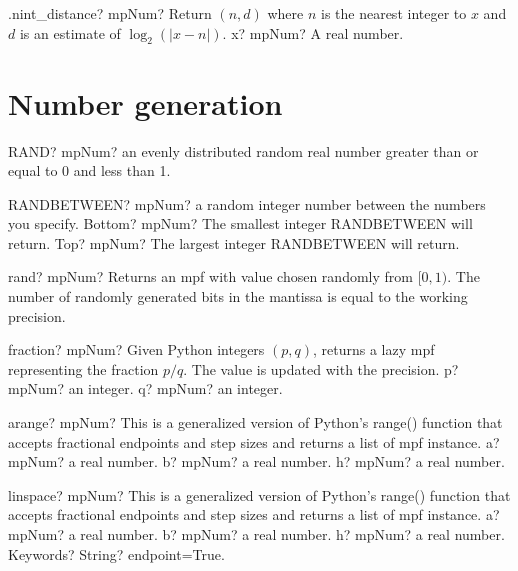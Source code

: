 \documentclass[12pt,a4paper,openany]{book}
\begin{document}
\begin{mpFunctionsExtract}
\mpFunctionOne
{.nint\_distance? mpNum? Return $(n,d)$ where $n$ is the nearest integer to $x$ and $d$ is an estimate of $\log_2(|x-n|)$.}
{x? mpNum? A real number.}
\end{mpFunctionsExtract}

\section{Number generation}

\begin{mpFunctionsExtract}
\mpWorksheetFunctionZero
{RAND? mpNum? an evenly distributed random real number greater than or equal to 0 and less than 1.}
\end{mpFunctionsExtract}

\begin{mpFunctionsExtract}
\mpWorksheetFunctionTwoNotImplemented
{RANDBETWEEN? mpNum?  a random integer number between the numbers you specify.}
{Bottom? mpNum? The smallest integer RANDBETWEEN will return.}
{Top? mpNum? The largest integer RANDBETWEEN will return.}
\end{mpFunctionsExtract}

\begin{mpFunctionsExtract}
\mpFunctionZero
{rand? mpNum? Returns an mpf with value chosen randomly from $[0,1)$. The number of randomly generated bits in the mantissa is equal to the working precision.}
\end{mpFunctionsExtract}

\begin{mpFunctionsExtract}
\mpFunctionTwo
{fraction? mpNum?  Given Python integers $(p,q)$, returns a lazy mpf representing the fraction $p/q$. The value is updated with the precision.}
{p? mpNum? an integer.}
{q? mpNum? an integer.}
\end{mpFunctionsExtract}

\begin{mpFunctionsExtract}
\mpFunctionThree
{arange? mpNum?  This is a generalized version of Python's range() function that accepts fractional endpoints and step sizes and returns a list of mpf instance.}
{a? mpNum? a real number.}
{b? mpNum? a real number.}
{h? mpNum? a real number.}
\end{mpFunctionsExtract}

\begin{mpFunctionsExtract}
\mpFunctionFour
{linspace? mpNum?  This is a generalized version of Python's range() function that accepts fractional endpoints and step sizes and returns a list of mpf instance.}
{a? mpNum? a real number.}
{b? mpNum? a real number.}
{h? mpNum? a real number.}
{Keywords? String? endpoint=True.}
\end{mpFunctionsExtract}
\end{document}

